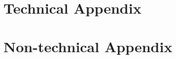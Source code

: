 \section{Technical Appendix}
\label{sec:Tec_App}


\section{Non-technical Appendix}
\label{sec:NonTec_App}
























